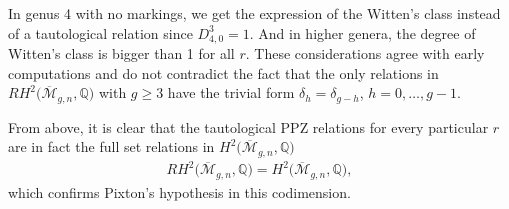 \documentclass[10pt,a4paper]{amsart}
\def\oM{\overline{\mathcal{M}}}
\numberwithin{equation}{section}
\begin{document}
In genus 4 with no markings, we get the expression of the Witten's class instead of a tautological relation since
$D^3_{4,0} = 1$.
And in higher genera, the degree of Witten's class is bigger than 1 for all $r$. These considerations agree with early computations and do not contradict the fact that the only relations in $RH^2\big(\oM_{g,n},\mathbb{Q}\big)$ with $g\geq 3$ have the trivial form $\delta_h=\delta_{g-h}$, $h=0,\dots, g-1$.

From above, it is clear that the tautological PPZ relations for every particular $r$ are in fact the full set relations in $H^2\big(\oM_{g,n},\mathbb{Q}\big)$
 \begin{align*}
RH^2\big(\oM_{g,n},\mathbb{Q}\big) = H^2\big(\oM_{g,n},\mathbb{Q}\big),
\end{align*}
which confirms Pixton's hypothesis in this codimension.
\end{document}
